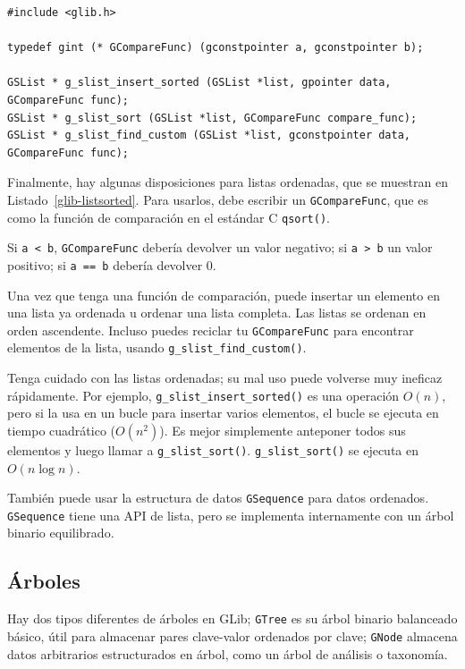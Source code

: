 \begin{lstlisting}[float, caption={Listas ordenadas}, label=glib-listsorted]
#include <glib.h>

typedef gint (* GCompareFunc) (gconstpointer a, gconstpointer b);

GSList * g_slist_insert_sorted (GSList *list, gpointer data, GCompareFunc func);
GSList * g_slist_sort (GSList *list, GCompareFunc compare_func);
GSList * g_slist_find_custom (GSList *list, gconstpointer data, GCompareFunc func);
\end{lstlisting}

Finalmente, hay algunas disposiciones para listas ordenadas, que se muestran en Listado~\ref{glib-listsorted}. Para usarlos, debe escribir un \lstinline{GCompareFunc}, que es como la función de comparación en el estándar C \lstinline{qsort()}.

Si \lstinline{a < b}, \lstinline{GCompareFunc} debería devolver un valor negativo; si \lstinline{a > b} un valor positivo; si \lstinline{a == b} debería devolver 0.

Una vez que tenga una función de comparación, puede insertar un elemento en una lista ya ordenada u ordenar una lista completa. Las listas se ordenan en orden ascendente. Incluso puedes reciclar tu \lstinline{GCompareFunc} para encontrar elementos de la lista, usando \lstinline{g_slist_find_custom()}.

Tenga cuidado con las listas ordenadas; su mal uso puede volverse muy ineficaz rápidamente. Por ejemplo, \lstinline{g_slist_insert_sorted()} es una operación $O(n)$, pero si la usa en un bucle para insertar varios elementos, el bucle se ejecuta en tiempo cuadrático ($O(n^2)$). Es mejor simplemente anteponer todos sus elementos y luego llamar a \lstinline{g_slist_sort()}. \lstinline{g_slist_sort()} se ejecuta en $O(n \log n)$.

También puede usar la estructura de datos \lstinline{GSequence} para datos ordenados. \lstinline{GSequence} tiene una API de lista, pero se implementa internamente con un árbol binario equilibrado.

\subsection{Árboles}

Hay dos tipos diferentes de árboles en GLib; \lstinline{GTree} es su árbol binario balanceado básico, útil para almacenar pares clave-valor ordenados por clave; \lstinline{GNode} almacena datos arbitrarios estructurados en árbol, como un árbol de análisis o taxonomía.

